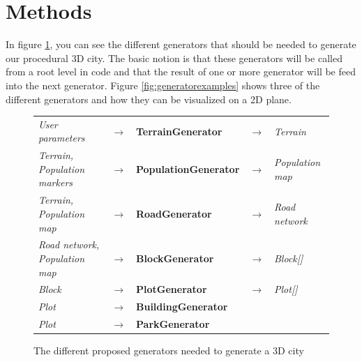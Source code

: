 \section{Methods}
In figure \ref{fig:generators}, you can see the different generators that should be needed to generate our procedural 3D city. 
The basic notion is that these generators will be called from a root level in code and that the result of one or more generator will be feed into the next generator.
Figure \ref{fig:generatorexamples} shows three of the different generators and how they can be visualized on a 2D plane. 

\begin{center}
  \begin{figure}[H]
    \begin{center}
      \begin{table}[H]
        \begin{tabular}{lllll}
          \textit{User parameters}              & $\rightarrow$ & \textbf{TerrainGenerator}    & $\rightarrow$ & \textit{Terrain}        \\
          \textit{Terrain, Population markers}  & $\rightarrow$ & \textbf{PopulationGenerator} & $\rightarrow$ & \textit{Population map} \\
          \textit{Terrain, Population map}      & $\rightarrow$ & \textbf{RoadGenerator}       & $\rightarrow$ & \textit{Road network}   \\
          \textit{Road network, Population map} & $\rightarrow$ & \textbf{BlockGenerator}      & $\rightarrow$ & \textit{Block{[}{]}}    \\
          \textit{Block}                        & $\rightarrow$ & \textbf{PlotGenerator}       & $\rightarrow$ & \textit{Plot{[}{]}}     \\
          \textit{Plot}                         & $\rightarrow$ & \textbf{BuildingGenerator}   &               &                         \\
          \textit{Plot}                         & $\rightarrow$ & \textbf{ParkGenerator}       &               &                        
        \end{tabular}
      \end{table}
    \end{center}
    \caption[]{The different proposed generators needed to generate a 3D city}
    \label{fig:generators}
  \end{figure}
\end{center}

